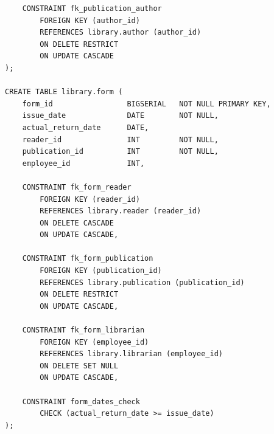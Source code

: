 \begin{verbatim}
    CONSTRAINT fk_publication_author
        FOREIGN KEY (author_id)
        REFERENCES library.author (author_id)
        ON DELETE RESTRICT
        ON UPDATE CASCADE
);

CREATE TABLE library.form (
    form_id                 BIGSERIAL   NOT NULL PRIMARY KEY,
    issue_date              DATE        NOT NULL,
    actual_return_date      DATE,
    reader_id               INT         NOT NULL,
    publication_id          INT         NOT NULL,
    employee_id             INT,

    CONSTRAINT fk_form_reader
        FOREIGN KEY (reader_id)
        REFERENCES library.reader (reader_id)
        ON DELETE CASCADE
        ON UPDATE CASCADE,

    CONSTRAINT fk_form_publication
        FOREIGN KEY (publication_id)
        REFERENCES library.publication (publication_id)
        ON DELETE RESTRICT
        ON UPDATE CASCADE,

    CONSTRAINT fk_form_librarian
        FOREIGN KEY (employee_id)
        REFERENCES library.librarian (employee_id)
        ON DELETE SET NULL
        ON UPDATE CASCADE,

    CONSTRAINT form_dates_check
        CHECK (actual_return_date >= issue_date)
);
    \end{verbatim}